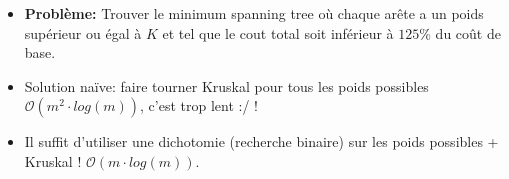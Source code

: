 \begin{frame}
    \frametitle{\problemtitle}
    \begin{itemize}
        \item<+-> \textbf{Problème:} Trouver le minimum spanning tree où chaque arête a un poids supérieur ou égal à $K$ et tel que le cout total soit inférieur à $125\%$ du coût de base.
        \item<+-> Solution na\"ive: faire tourner Kruskal pour tous les poids possibles $\mathcal O(m^2\cdot log(m))$, c'est trop lent :/ !
        \item<+-> Il suffit d'utiliser une dichotomie (recherche binaire) sur les poids possibles + Kruskal ! $\mathcal O(m \cdot log(m))$.
    \end{itemize}
\end{frame}
